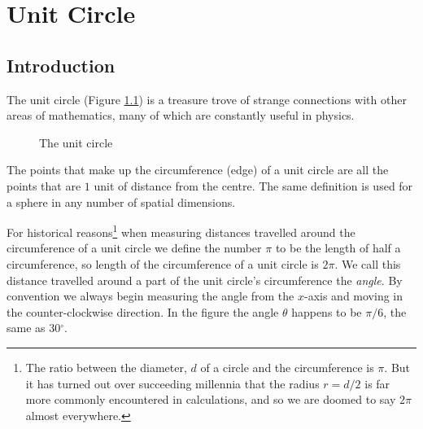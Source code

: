 \chapter{Unit Circle} \label{ch:unit-circle}

\section{Introduction}

The unit circle (Figure \ref{fig:unit-circle}) is a treasure trove of strange connections with other areas of mathematics, many of which are constantly useful in physics.

\begin{figure}[h]
    \centering
    \caption{The unit circle} \label{fig:unit-circle}
\end{figure}

The points that make up the circumference (edge) of a unit circle are all the points that are $1$ unit of distance from the centre. The same definition is used for a sphere in any number of spatial dimensions.

For historical reasons\footnote{The ratio between the diameter, $d$ of a circle and the circumference is $\pi$. But it has turned out over succeeding millennia that the radius $r = d/2$ is far more commonly encountered in calculations, and so we are doomed to say $2\pi$ almost everywhere.} when measuring distances travelled around the circumference of a unit circle we define the number $\pi$ to be the length of half a circumference, so length of the circumference of a unit circle is $2\pi$. We call this distance travelled around a part of the unit circle's circumference the \textit{angle}. By convention we always begin measuring the angle from the $x$-axis and moving in the counter-clockwise direction. In the figure the angle $\theta$ happens to be $\pi/6$, the same as 30$^\circ$.

